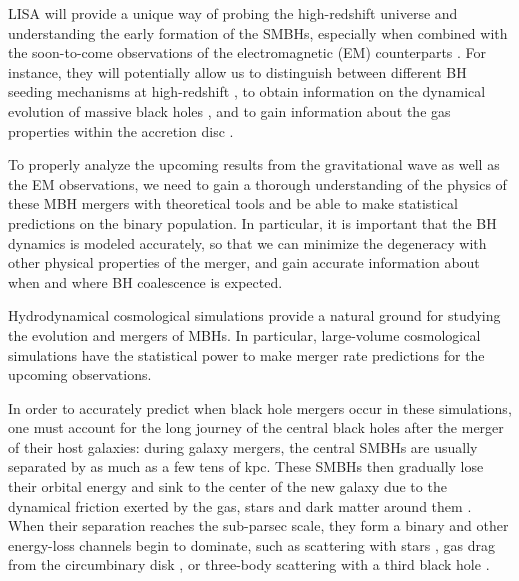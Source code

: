 LISA will provide a unique way of probing the high-redshift universe and understanding the early formation of the SMBHs, especially when combined with the soon-to-come observations of the electromagnetic (EM) counterparts \citep[][]{Natarajan2017,DeGraf2020}.
For instance, they will potentially allow us to distinguish between different BH seeding mechanisms at high-redshift \citep[][]{Ricarte2018}, to obtain information on the dynamical evolution of massive black holes \citep[][]{Bonetti2019}, and to gain information about the gas properties within the accretion disc \citep[][]{Derdzinski2019}. 

To properly analyze the upcoming results from the gravitational wave as well as the EM observations, we need to gain a thorough understanding of the physics of these MBH mergers with theoretical tools and be able to make statistical predictions on the binary population. In particular, it is important that the BH dynamics is modeled accurately, so that we can minimize the degeneracy with other physical properties of the merger, and gain accurate information about when and where BH coalescence is expected.

Hydrodynamical cosmological simulations provide a natural ground for studying the evolution and mergers of MBHs. In particular, large-volume cosmological simulations \citep[e.g.][]{Hirschmann2014,Vogelsberger2014,Schaye2015,Feng2016,Volonteri2016,Pillepich2018,Dave2019} have the statistical power to make merger rate predictions for the upcoming observations. 

In order to accurately predict when black hole mergers occur in these simulations, one must account for the long journey of the central black holes after the merger of their host galaxies: during galaxy mergers, the central SMBHs are usually separated by as much as a few tens of kpc. These SMBHs then gradually lose their orbital energy and sink to the center of the new galaxy due to the dynamical friction exerted by the gas, stars and dark matter around them \citep[e.g.][]{Chandrasekhar1943,Ostriker1999}. When their separation reaches the sub-parsec scale, they form a binary and other energy-loss channels begin to dominate, such as scattering with stars \citep[e.g.][]{Quinlan1996,Sesana2007b,Vasiliev2015}, gas drag from the circumbinary disk \citep[e.g.][]{Haiman2009}, or three-body scattering with a third black hole \citep[e.g.][]{Bonetti2018}.


